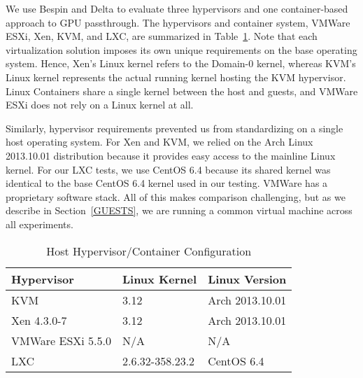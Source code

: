 We use Bespin and Delta to evaluate three hypervisors and one container-based
approach to GPU passthrough. The hypervisors and container system, VMWare ESXi,
Xen, KVM, and LXC, are summarized in Table~\ref{HYPERVISORS}.  Note that each
virtualization solution imposes its own unique requirements on the base
operating system.  Hence, Xen's Linux kernel refers to the Domain-0 kernel,
whereas KVM's Linux kernel represents the actual running kernel hosting the KVM
hypervisor.  Linux Containers share a single kernel between the host
and guests, and VMWare ESXi does not rely on a Linux kernel at all.  

Similarly, hypervisor requirements prevented us from standardizing on a single host operating system.  For Xen
and KVM, we relied on the Arch Linux 2013.10.01 distribution because it provides
easy access to the mainline Linux kernel.  For our LXC tests, we use CentOS
6.4 because its shared kernel was identical to the base CentOS 6.4 kernel used
in our testing.  VMWare has a
proprietary software stack.  All of this makes comparison challenging, but as we describe in
Section~\ref{GUESTS}, we are running a common virtual machine across all
experiments.





\begin{table}
\small
\renewcommand{\arraystretch}{1.3}
\caption{Host Hypervisor/Container Configuration}
\label{HYPERVISORS}
\centering
\begin{tabular}{|l||l|l|}
\hline
Hypervisor & Linux Kernel & Linux Version \\ \hline 
KVM & 3.12 & Arch 2013.10.01 \\ \hline 
Xen 4.3.0-7 & 3.12 & Arch 2013.10.01 \\ \hline
VMWare ESXi 5.5.0 & N/A & N/A \\ \hline
LXC & 2.6.32-358.23.2 & CentOS 6.4 \\ \hline

\end{tabular}
\end{table}


